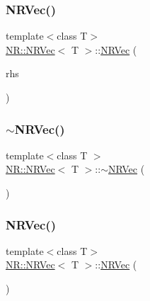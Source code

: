 \mbox{\label{classNR_1_1NRVec_a89f4e31b7ca536611076d5ad70f84770}} 
\subsubsection{\texorpdfstring{NRVec()}{NRVec()}\hspace{0.1cm}{\footnotesize\ttfamily [5/10]}}
{\footnotesize\ttfamily template$<$class T$>$ \\
\mbox{\hyperlink{classNR_1_1NRVec}{N\+R\+::\+N\+R\+Vec}}$<$ T $>$\+::\mbox{\hyperlink{classNR_1_1NRVec}{N\+R\+Vec}} (\begin{DoxyParamCaption}\item[{const \mbox{\hyperlink{classNR_1_1NRVec}{N\+R\+Vec}}$<$ T $>$ \&}]{rhs }\end{DoxyParamCaption})}

\mbox{\label{classNR_1_1NRVec_a7161dfe4a95a73eca56d084c662f8eae}} 
\subsubsection{\texorpdfstring{$\sim$NRVec()}{~NRVec()}\hspace{0.1cm}{\footnotesize\ttfamily [1/2]}}
{\footnotesize\ttfamily template$<$class T $>$ \\
\mbox{\hyperlink{classNR_1_1NRVec}{N\+R\+::\+N\+R\+Vec}}$<$ T $>$\+::$\sim$\mbox{\hyperlink{classNR_1_1NRVec}{N\+R\+Vec}} (\begin{DoxyParamCaption}{ }\end{DoxyParamCaption})}

\mbox{\label{classNR_1_1NRVec_a3c549533b11738d9c1320abd0078f5aa}} 
\subsubsection{\texorpdfstring{NRVec()}{NRVec()}\hspace{0.1cm}{\footnotesize\ttfamily [6/10]}}
{\footnotesize\ttfamily template$<$class T$>$ \\
\mbox{\hyperlink{classNR_1_1NRVec}{N\+R\+::\+N\+R\+Vec}}$<$ T $>$\+::\mbox{\hyperlink{classNR_1_1NRVec}{N\+R\+Vec}} (\begin{DoxyParamCaption}{ }\end{DoxyParamCaption})}

